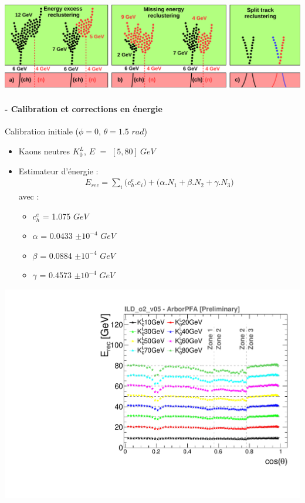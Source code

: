 \documentclass[8pt]{beamer}
\begin{document}
\begin{frame}
\begin{overprint}
       \centering \includegraphics[width=0.8\linewidth]{ReclusteringAlgorithmsILD.pdf}
    \end{overprint}
  \end{frame}


  \begin{frame}
  \frametitle{\secname}
  \framesubtitle{\subsecname - Calibration et corrections en énergie}
    \begin{minipage}{0.6\linewidth}
      \begin{block}{Calibration initiale ($\phi=0$, $\theta=1.5$ $rad$)}
        \begin{itemize}
          \item Kaons neutres $K_{0}^{L}$, $E$ $=$ $[5, 80]~GeV$
          \item Estimateur d'énergie :
          \begin{align*}
            E_{rec} = \sum_{i} \big(c_{h}^{e}.e_i\big) + \big(\alpha.N_1 + \beta.N_2 + \gamma.N_3\big)
          \end{align*}
          avec :
          \begin{itemize}
            \item $c_{h}^{e}$ = 1.075 $GeV$
            \item $\alpha$ = 0.0433 $\pm 10^{-4}$ $GeV$
            \item $\beta$  = 0.0884  $\pm 10^{-4}$ $GeV$
            \item $\gamma$ = 0.4573  $\pm 10^{-4}$ $GeV$
          \end{itemize}
        \end{itemize}
      \end{block}
      \begin{center}
        \includegraphics[width=0.6\linewidth]{ERec_thesis.pdf}

\end{center}
\end{minipage}
\end{frame}
\end{document}
